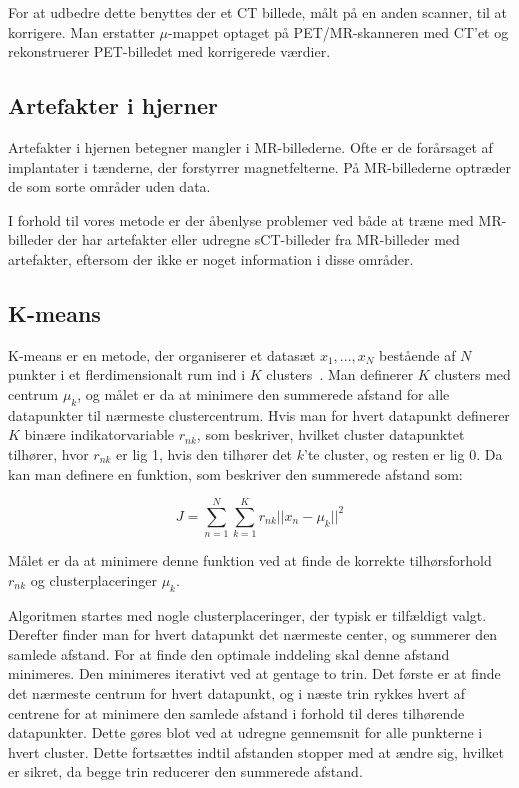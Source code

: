 For at udbedre dette benyttes der et CT billede, målt
på en anden scanner, til at korrigere. Man erstatter $\mu$-mappet
optaget på PET/MR-skanneren med CT'et og rekonstruerer PET-billedet med
korrigerede værdier.

\subsection{Artefakter i hjerner}

Artefakter i hjernen betegner mangler i MR-billederne. Ofte er de
forårsaget af implantater i tænderne, der forstyrrer magnetfelterne.
På MR-billederne optræder de som sorte områder uden data.

I forhold til vores metode er der åbenlyse problemer ved både at
træne med MR-billeder der har artefakter eller udregne sCT-billeder fra
MR-billeder med artefakter, eftersom der ikke er noget
information i disse områder.


\subsection{K-means}

K-means er en metode, der organiserer et datasæt ${x_1,...,x_N}$
bestående af $N$ punkter i et flerdimensionalt rum ind i $K$ clusters~\cite{bishop}.
Man definerer $K$ clusters med centrum $\mu_k$, og målet er da at
minimere den summerede afstand for alle datapunkter til nærmeste clustercentrum. Hvis man for hvert datapunkt definerer $K$ binære indikatorvariable $r_{nk}$, som beskriver, hvilket cluster datapunktet tilhører,
hvor $r_{nk}$ er lig 1, hvis den tilhører det $k$'te cluster, og resten
er lig 0. Da kan man definere en funktion, som beskriver den summerede
afstand som:

$$
J = \sum_{n=1}^{N} \sum_{k=1}^{K} r_{nk} || x_n - \mu_k ||^2
$$

Målet er da at minimere denne funktion ved at finde de korrekte
tilhørsforhold $r_{nk}$ og clusterplaceringer $\mu_k$.

Algoritmen startes med nogle clusterplaceringer, der typisk
er tilfældigt valgt. Derefter finder man for hvert datapunkt det
nærmeste center, og summerer den samlede afstand. For at finde den
optimale inddeling skal denne afstand minimeres. Den minimeres iterativt
ved at gentage to trin. Det første er at finde det nærmeste centrum for
hvert datapunkt, og i næste trin rykkes hvert af centrene for at minimere
den samlede afstand i forhold til deres tilhørende datapunkter. Dette
gøres blot ved at udregne gennemsnit for alle punkterne i hvert cluster. Dette
fortsættes indtil afstanden stopper med at ændre sig, hvilket er sikret,
da begge trin reducerer den summerede afstand.

